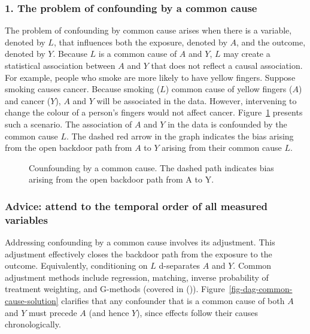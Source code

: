 \documentclass[
  singlecolumn,
  9pt]{article}
\begin{document}
\subsubsection{1. The problem of confounding by a common
cause}\label{the-problem-of-confounding-by-a-common-cause}

The problem of confounding by common cause arises when there is a
variable, denoted by \(L\), that influences both the exposure, denoted
by \(A\), and the outcome, denoted by \(Y.\) Because \(L\) is a common
cause of \(A\) and \(Y\), \(L\) may create a statistical association
between \(A\) and \(Y\) that does not reflect a causal association. For
example, people who smoke are more likely to have yellow fingers.
Suppose smoking causes cancer. Because smoking (\(L\)) common cause of
yellow fingers (\(A\)) and cancer (\(Y\)), \(A\) and \(Y\) will be
associated in the data. However, intervening to change the colour of a
person's fingers would not affect cancer.
Figure~\ref{fig-dag-common-cause} presents such a scenario. The
association of \(A\) and \(Y\) in the data is confounded by the common
cause \(L\). The dashed red arrow in the graph indicates the bias
arising from the open backdoor path from \(A\) to \(Y\) arising from
their common cause \(L\).

\begin{figure}


\caption{\label{fig-dag-common-cause}Counfounding by a common cause. The
dashed path indicates bias arising from the open backdoor path from A to
Y.}

\end{figure}%

\subsubsection{Advice: attend to the temporal order of all measured
variables}\label{advice-attend-to-the-temporal-order-of-all-measured-variables}

Addressing confounding by a common cause involves its adjustment. This
adjustment effectively closes the backdoor path from the exposure to the
outcome. Equivalently, conditioning on \(L\) d-separates \(A\) and
\(Y\). Common adjustment methods include regression, matching, inverse
probability of treatment weighting, and G-methods (covered in
()).
Figure~\ref{fig-dag-common-cause-solution} clarifies that any confounder
that is a common cause of both \(A\) and \(Y\) must precede \(A\) (and
hence \(Y\)), since effects follow their causes chronologically.
\end{document}
